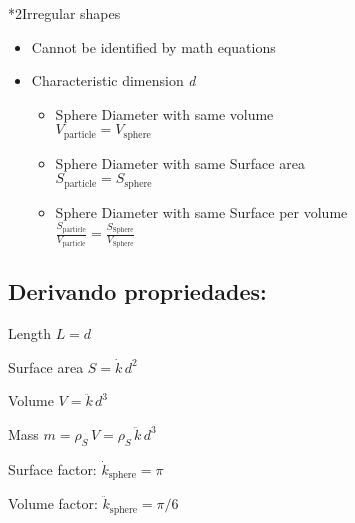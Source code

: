 \documentclass[OSF-Notebook.tex]{subfiles}
\begin{document}
\begin{sectionBox}*2{Irregular shapes} %

  \begin{itemize}
    \item Cannot be identified by math equations
    \item Characteristic dimension \textit{d}
      \begin{itemize}
        \item Sphere Diameter with same volume 
          \\ \(V_{\text{particle}}=V_{\text{sphere}}\)
        \item Sphere Diameter with same Surface area
          \\ \(S_{\text{particle}}=S_{\text{sphere}}\)
        \item Sphere Diameter with same Surface per volume
          \\\(
            \frac
            {S_{\text{particle}}}
            {V_{\text{particle}}}
            = \frac
            {S_{\text{Sphere}}}
            {V_{\text{Sphere}}}
          \)
      \end{itemize}
  \end{itemize}
  \subsection*{Derivando propriedades:}
  \begin{description}[
      leftmargin=!,
      labelwidth=\widthof{Surface area} %
    ]
    \begin{multicols}{2}
      \item[Length]       \( L=d\)
      \item[Surface area] \( S=\dot{k}\,d^2\)
      \item[Volume]       \( V=\ddot{k}\,d^3\)
      \item[Mass]         \( m=\rho_S\,V=\rho_S\,\ddot{k}\,d^3\)
      \end{multicols}
  \end{description}
  \begin{itemize}
    \begin{multicols}{2}
      \item Surface factor: \(\dot{k}_{\text{sphere}}=\pi\)
      \item Volume factor: \(\ddot{k}_{\text{sphere}}=\pi/6\)
      \end{multicols}
  \end{itemize}
\end{sectionBox}
\end{document}
